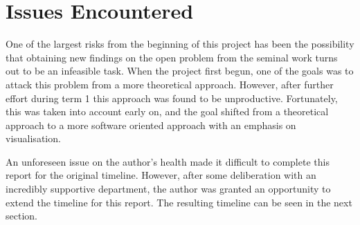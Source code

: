 \section{Issues Encountered}

One of the largest risks from the beginning of this project has been the possibility that obtaining new findings on the open problem from the seminal work \cite{chistikov2020re} turns out to be an infeasible task. When the project first begun, one of the goals was to attack this problem from a more theoretical approach. However, after further effort during term 1 this approach was found to be unproductive. 
Fortunately, this was taken into account early on, and the goal shifted from a theoretical approach to a more software oriented approach with an emphasis on visualisation.

An unforeseen issue on the author's health made it difficult to complete this report for the original timeline. However, after some deliberation with an incredibly supportive department, the author was granted an opportunity to extend the timeline for this report. The resulting timeline can be seen in the next section.